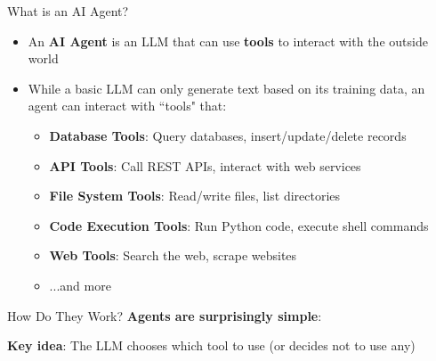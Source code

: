\documentclass[aspectratio=169]{beamer}
\begin{document}
\begin{frame}{What is an AI Agent?}
\begin{itemize}
    \item An \textbf{AI Agent} is an LLM that can use \textbf{tools} to interact with the outside world
    \item While a basic LLM can only generate text based on its training data, an agent can interact with ``tools" that:
\begin{itemize}
    \item \textbf{Database Tools}: Query databases, insert/update/delete records
    \item \textbf{API Tools}: Call REST APIs, interact with web services
    \item \textbf{File System Tools}: Read/write files, list directories
    \item \textbf{Code Execution Tools}: Run Python code, execute shell commands
    \item \textbf{Web Tools}: Search the web, scrape websites
    \item ...and more
\end{itemize}
\end{itemize}
\end{frame}


\begin{frame}{How Do They Work?}
\textbf{Agents are surprisingly simple}:
\vspace{0.3cm}

\begin{center}
\end{center}
\vspace{0.3cm}

\textbf{Key idea}: The LLM chooses which tool to use (or decides not to use any)
\end{frame}
\end{document}
